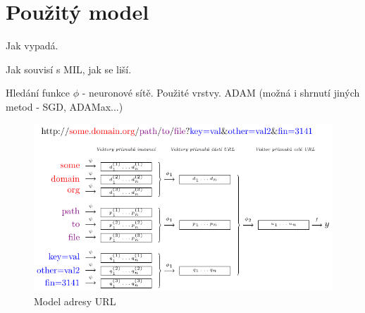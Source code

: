 \chapter{Použitý model}

Jak vypadá.

Jak souvisí s MIL, jak se liší.

Hledání funkce \( \phi \) - neuronové sítě. Použité vrstvy. ADAM (možná i shrnutí jiných metod - SGD, ADAMax...)

\begin{figure}
	\caption{Model adresy URL}\label{url_model}
	\centering
	\includegraphics{images/model/model.pdf}
\end{figure}

